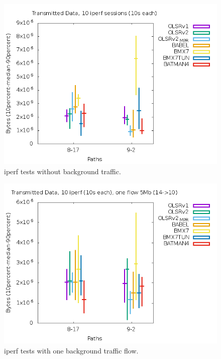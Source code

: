 \documentclass[10pt,onecolumn]{paper}
\begin{document}
\begin{figure}[!htb]
  \centering
    \includegraphics[width=.9\linewidth]{images/failure_test_iperf_10runs-IPv6.png}
    \caption{iperf tests without background traffic.}
  \label{fig:iperfnoflows}
\end{figure}

\begin{figure}[!htb]
  \centering
    \includegraphics[width=.9\linewidth]{images/failure_test_iperf_10runs-IPv6-oneflow.png}
    \caption{iperf tests with one background traffic flow.}
  \label{fig:iperfoneflow}
\end{figure}
\end{document}
